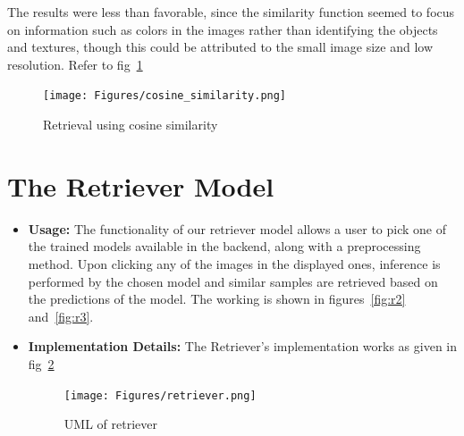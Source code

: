 \documentclass[a4paper]{article}
\theoremstyle{plain}
\theoremstyle{definition}
\begin{document}
{\noindent The results were less than favorable, since the similarity function seemed to focus on information such as colors in the images rather than identifying the objects and textures, though this could be attributed to the small image size and low resolution. Refer to fig~\ref{fig:sim}


 \begin{figure}
            \centering
            \texttt{[image: Figures/cosine\_similarity.png]}
            \caption{Retrieval using cosine similarity}
            \label{fig:sim}
        \end{figure}


\newpage



\section {The Retriever Model}


\begin{itemize}
\item[] \textbf{Usage:} The functionality of our retriever model allows a user to pick one of the trained models available in the backend, along with a preprocessing method.
Upon clicking any of the images in the displayed ones, inference is performed by the chosen model and similar samples are retrieved based on the predictions of the model. The working is shown in figures~\ref{fig:r2} and~\ref{fig:r3}.



    
    \item[] \textbf{Implementation Details:} The Retriever’s implementation works as given in fig~\ref{fig:r1}
    
\begin{figure}[h]
\centering

  \centering
  \texttt{[image: Figures/retriever.png]} %
  \caption{UML of retriever}
  \label{fig:r1}
\end{figure}


\end{itemize}}
\end{document}
